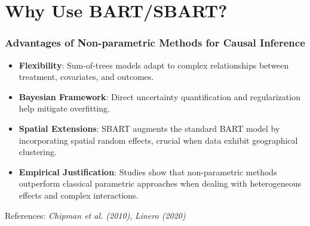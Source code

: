 \documentclass{beamer}
\begin{document}
\section{Why Use BART/SBART?}

\begin{frame}
\frametitle{Advantages of Non-parametric Methods for Causal Inference}
\begin{itemize}
    \item \textbf{Flexibility}: Sum-of-trees models adapt to complex relationships between treatment, covariates, and outcomes.
    \item \textbf{Bayesian Framework}: Direct uncertainty quantification and regularization help mitigate overfitting.
    \item \textbf{Spatial Extensions}: SBART augments the standard BART model by incorporating spatial random effects, crucial when data exhibit geographical clustering.
    \item \textbf{Empirical Justification}: Studies show that non-parametric methods outperform classical parametric approaches when dealing with heterogeneous effects and complex interactions.
\end{itemize}
\vspace{0.2cm}
\footnotesize References: \textit{Chipman et al. (2010)}, \textit{Linero (2020)}
\end{frame}
\end{document}

